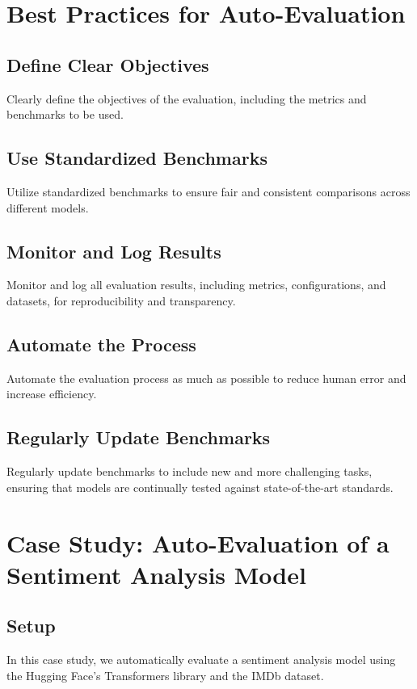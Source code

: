 \section{Best Practices for Auto-Evaluation}

\subsection{Define Clear Objectives}
Clearly define the objectives of the evaluation, including the metrics and benchmarks to be used.

\subsection{Use Standardized Benchmarks}
Utilize standardized benchmarks to ensure fair and consistent comparisons across different models.

\subsection{Monitor and Log Results}
Monitor and log all evaluation results, including metrics, configurations, and datasets, for reproducibility and transparency.

\subsection{Automate the Process}
Automate the evaluation process as much as possible to reduce human error and increase efficiency.

\subsection{Regularly Update Benchmarks}
Regularly update benchmarks to include new and more challenging tasks, ensuring that models are continually tested against state-of-the-art standards.

\section{Case Study: Auto-Evaluation of a Sentiment Analysis Model}

\subsection{Setup}
In this case study, we automatically evaluate a sentiment analysis model using the Hugging Face's Transformers library and the IMDb dataset.

